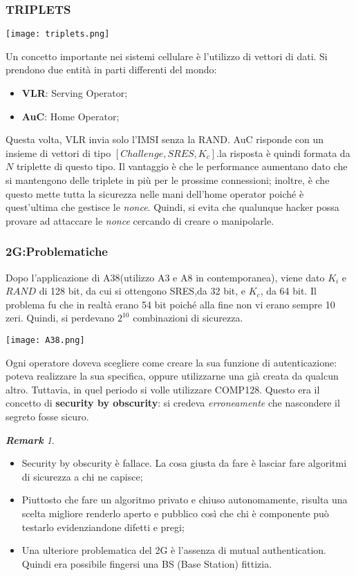 \documentclass{article}
\theoremstyle{remark}
\newtheorem*{remark}{\textbf{Remark}}
\begin{document}
\subsubsection{TRIPLETS}
\begin{center}
	\texttt{[image: triplets.png]}
\end{center}
Un concetto importante nei sistemi cellulare è l'utilizzo di vettori di dati. Si prendono due entità in parti differenti del mondo:\begin{itemize}
	\item \textbf{VLR}: Serving Operator;
	\item \textbf{AuC}: Home Operator;
\end{itemize}
Questa volta, VLR invia solo l'IMSI senza la RAND. AuC risponde con un insieme di vettori di tipo $[Challenge,SRES,K_c]$.\newline la risposta è quindi formata da $N$ triplette di questo tipo. Il vantaggio è che le performance aumentano dato che si mantengono delle triplete in più per le prossime connessioni; inoltre, è che questo mette tutta la sicurezza nelle mani dell'home operator poiché è quest'ultima che gestisce le \emph{nonce}. Quindi, si evita che qualunque hacker possa provare ad attaccare le \emph{nonce} cercando di creare o manipolarle.
\subsubsection{2G:Problematiche}
Dopo l'applicazione di A38(utilizzo A3 e A8 in contemporanea), viene dato $K_i$ e $RAND$ di 128 bit, da cui si ottengono SRES,da 32 bit, e $K_c$, da 64 bit. Il problema fu che in realtà erano 54 bit poiché alla fine non vi erano sempre 10 zeri. Quindi, si perdevano $2^{10}$ combinazioni di sicurezza.
\begin{center}
	\texttt{[image: A38.png]}
\end{center}
Ogni operatore doveva scegliere come creare la sua funzione di autenticazione: poteva realizzare la sua specifica, oppure utilizzarne una già creata da qualcun altro. Tuttavia, in quel periodo si volle utilizzare COMP128. Questo era il concetto di \textbf{security by obscurity}: si credeva \emph{erroneamente} che nascondere il segreto fosse sicuro.
\begin{remark}
	\begin{itemize}
		\item Security by obscurity è fallace. La cosa giusta da fare è lasciar fare algoritmi di sicurezza a chi ne capisce;
		\item Piuttosto che fare un algoritmo privato e chiuso autonomamente, risulta una scelta migliore renderlo aperto e pubblico così che chi è componente può testarlo evidenziandone difetti e pregi;
		\item Una ulteriore problematica del 2G è l'assenza di mutual authentication. Quindi era possibile fingersi una BS (Base Station) fittizia.
	\end{itemize}
\end{remark}
\end{document}

